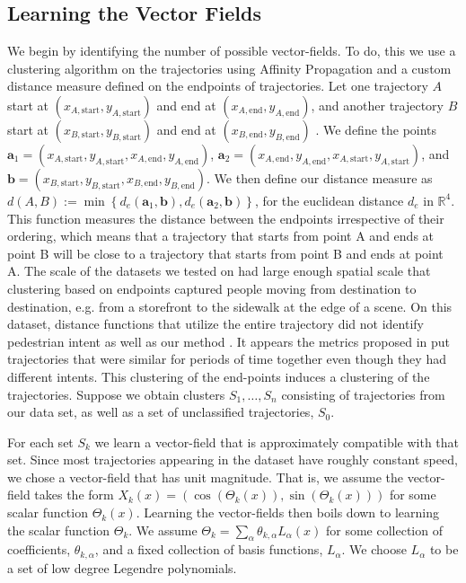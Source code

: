 \documentclass[letterpaper,10pt,conference]{ieeeconf}
\begin{document}
  \subsection{Learning the Vector Fields}
 We begin by identifying the number of possible vector-fields.
To do, this we use a clustering algorithm on the trajectories using Affinity Propagation \cite{FreyDueck2007} and a custom distance measure defined on the endpoints of trajectories. 
	Let one trajectory $A$ start at $(x_{A,\mathrm{start}}, y_{A,\mathrm{start}})$ and end at  $(x_{A,\mathrm{end}}, y_{A,\mathrm{end}})$, and another trajectory $B$ start at $(x_{B,\mathrm{start}}, y_{B,\mathrm{start}})$ and end at $(x_{B,\mathrm{end}}, y_{B,\mathrm{end}})$ . 
	We define the points $\mathbf{a}_1 = (x_{A, \mathrm{start}}, y_{A, \mathrm{start}}, x_{A, \mathrm{end}}, y_{A, \mathrm{end}})$, $\mathbf{a}_2 = (x_{A, \mathrm{end}}, y_{A, \mathrm{end}}, x_{A, \mathrm{start}}, y_{A, \mathrm{start}})$, and $\mathbf{b} = (x_{B, \mathrm{start}}, y_{B, \mathrm{start}}, x_{B, \mathrm{end}}, y_{B, \mathrm{end}})$. 
	We then define our distance measure as $d(A, B) :=  \min \left\{ d_e(\mathbf{a}_1, \mathbf{b}), d_e(\mathbf{a}_2, \mathbf{b}) \right\}$, for the euclidean distance $d_e$ in $\mathbb{R}^4$. 
	This function measures the distance between the endpoints irrespective of their ordering, which means that a trajectory that starts from point A and ends at point B will be close to a trajectory that starts from point B and ends at point A.
	The scale of the datasets we tested on had large enough spatial scale that clustering based on endpoints captured people moving from destination to destination, e.g. from a storefront to the sidewalk at the edge of a scene. 
	 On this dataset, distance functions that utilize the entire trajectory did not identify pedestrian intent as well as our method \cite{Morris2009,Lee2007}. It appears the metrics proposed in \cite{Morris2009} put trajectories that were similar for periods of time together even though they had different intents.
	This clustering of the end-points induces a clustering of the trajectories.
  Suppose we obtain clusters $S_1, \dots, S_n$ consisting of trajectories from our data set, as well as a set of unclassified trajectories, $S_0$.
  
  For each set $S_k$ we learn a vector-field that is approximately compatible with that set.
  Since most trajectories appearing in the dataset have roughly constant speed, we chose a vector-field that has unit magnitude. 
  That is, we assume the vector-field takes the form $X_k(x) = \left( \cos( \Theta_k(x) ) , \sin(\Theta_k(x)) \right)$ for some scalar function $\Theta_k(x)$.
  Learning the vector-fields then boils down to learning the scalar function $\Theta_k$.
  We assume $\Theta_k = \sum_{\alpha} \theta_{k,\alpha} L_{\alpha}(x)$ for some collection of coefficients, $\theta_{k,\alpha}$, and a fixed collection of basis functions, $L_{\alpha}$.
  We choose $L_{\alpha}$ to be a set of low degree Legendre polynomials.
 
\end{document}
